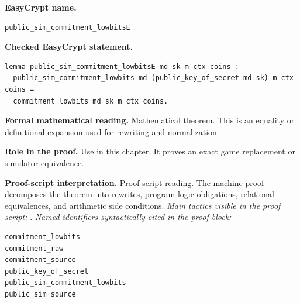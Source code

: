 \begin{formaltheorem}
\noindent\textbf{EasyCrypt name.}
\begin{lstlisting}[language=EasyCrypt,basicstyle=\ttfamily\scriptsize]
public_sim_commitment_lowbitsE
\end{lstlisting}
\noindent\textbf{Checked EasyCrypt statement.}
\begin{lstlisting}[language=EasyCrypt,basicstyle=\ttfamily\scriptsize]
lemma public_sim_commitment_lowbitsE md sk m ctx coins :
  public_sim_commitment_lowbits md (public_key_of_secret md sk) m ctx coins =
  commitment_lowbits md sk m ctx coins.
\end{lstlisting}
\noindent\textbf{Formal mathematical reading.}
Mathematical theorem. This is an equality or definitional expansion used for rewriting and normalization.

\noindent\textbf{Role in the proof.}
Use in this chapter. It proves an exact game replacement or simulator equivalence.

\noindent\textbf{Proof-script interpretation.}
Proof-script reading. The machine proof decomposes the theorem into rewrites, program-logic obligations, relational equivalences, and arithmetic side conditions.
\emph{Main tactics visible in the proof script:} .
\emph{Named identifiers syntactically cited in the proof block:}
\begin{lstlisting}[language=EasyCrypt,basicstyle=\ttfamily\scriptsize]
commitment_lowbits
commitment_raw
commitment_source
public_key_of_secret
public_sim_commitment_lowbits
public_sim_source
\end{lstlisting}

\end{formaltheorem}

